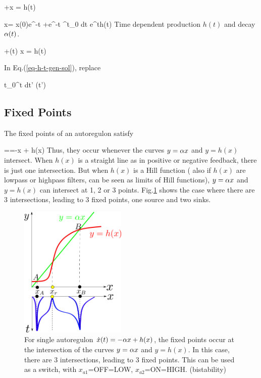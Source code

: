 \beq
{} +\alp x = h(t)
\eeq

\beq
x=
x(0)e^{-\alp t}
+e^{-\alp t}
\int^t_0 dt\;
e^{\alp t}h(t)
\label{eq-h-t-gen-sol}
\eeq
Time dependent production $h(t)$ and decay $\alpha(t)$.

\beq
{} +\alp(t) x = h(t)
\eeq

In Eq.(\ref{eq-h-t-gen-sol}), replace 

\beq
\alp t\rarrow \int_0^t dt'\; \alp(t')
\eeq



\subsection{Fixed Points}

The fixed points of an autoregulon satisfy

==-\alp x + h(x)
\eeq
Thus, they occur whenever the curves
$y=\alpha x$ and $y=h(x)$ intersect. When $h(x)$ is 
a straight line as in positive or negative
feedback, there is just one intersection. But when
$h(x)$ is a Hill function (
also if $h(x)$ are lowpass or highpass
filters, can be seen as limits of
Hill functions),
$y=\alpha x$ and $y=h(x)$ can intersect at 1, 2 or 3 points.
Fig.\ref{fig-source-sink-source} shows 
the case where there are 3 intersections, leading to 3 fixed points,
one source and two sinks.

\begin{figure}[h!]
\centering
\includegraphics[width=2in]
{autoregulons/source-sink-source.png}
\caption{For single autoregulon $\dot{x}(t)=-\alpha x + h(x)$, 
the fixed points occur at the intersection of the
curves $y=\alpha x$ and $y=h(x)$. In this case,
there are 3 intersections, leading to 3 fixed points. This can be used as a switch, with $x_{a1}$=OFF=LOW, $x_{a2}$=ON=HIGH. (bistability)
}
\label{fig-source-sink-source}
\end{figure}



